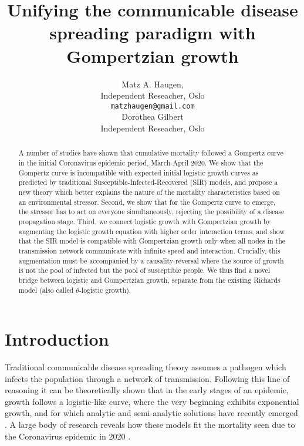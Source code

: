 \documentclass{article}
\title{Unifying the communicable disease spreading paradigm with Gompertzian growth}
\author{Matz A. Haugen, \\
Independent Reseacher, Oslo\\
\texttt{matzhaugen@gmail.com} \\
  \And
  Dorothea Gilbert \\
  Independent Reseacher, Oslo\\
}
\begin{document}
\maketitle

\begin{abstract}
A number of studies have shown that cumulative mortality followed a Gompertz curve in the initial Coronavirus epidemic period, March-April 2020. 
We show that the Gompertz curve is incompatible with expected initial logistic growth curves as predicted by traditional Susceptible-Infected-Recovered (SIR) models, and propose a new theory which better explains the nature of the mortality characteristics based on an environmental stressor. 
Second, we show that for the Gompertz curve to emerge, the stressor has to act on everyone simultaneously, rejecting the possibility of a disease propagation stage. 
Third, we connect logistic growth with Gompertzian growth by augmenting the logistic growth equation with higher order interaction terms, and show that the SIR model is compatible with Gompertzian growth only when all nodes in the transmission network communicate with infinite speed and interaction. Crucially, this augmentation must be accompanied by a causality-reversal where the source of growth is not the pool of infected but the pool of susceptible people. We thus find a novel bridge between logistic and Gompertzian growth, separate from the existing Richards model (also called $\theta$-logistic growth).
\end{abstract}


\section*{Introduction}
Traditional communicable disease spreading theory assumes a pathogen which infects the population through a network of transmission. 
Following this line of reasoning it can be theoretically shown that in the early stages of an epidemic, growth follows a logistic-like curve, where the very beginning exhibits exponential growth, and for which analytic and semi-analytic solutions have recently emerged \cite{harko2014exact,kroger2020analytical,schlickeiser2021analytical,heng2020approximately}. 
A large body of research reveals how these models fit the mortality seen due to the Coronavirus epidemic in 2020 \cite{carletti2020covid,cooper2020sir,postnikov2020estimation,munoz2021sir,cooper2022dynamical,saikia2021covid}. 
\end{document}
